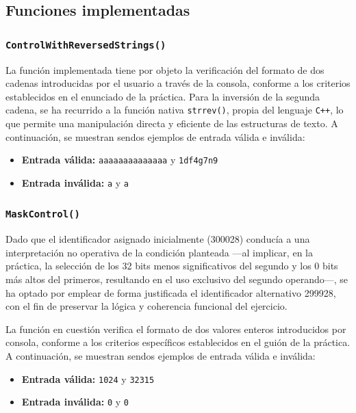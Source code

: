 \documentclass[11pt,a4paper]{article}
\begin{document}
\subsection{Funciones implementadas}
\subsubsection{\texttt{ControlWithReversedStrings()}}
La función implementada tiene por objeto la verificación del formato de dos cadenas introducidas por el usuario a través de la consola, conforme a los criterios establecidos en el enunciado de la práctica. Para la inversión de la segunda cadena, se ha recurrido a la función nativa \texttt{strrev()}, propia del lenguaje \texttt{C++}, lo que permite una manipulación directa y eficiente de las estructuras de texto. A continuación, se muestran sendos ejemplos de entrada válida e inválida:
\begin{itemize}
  \item \textbf{Entrada válida:} \texttt{aaaaaaaaaaaaaa} y \texttt{1df4g7n9}
  \item \textbf{Entrada inválida:} \texttt{a} y \texttt{a}
\end{itemize}

\vspace{3ex}

\subsubsection{\texttt{MaskControl()}}
\textcolor{naranjaDuro}{Dado que el identificador asignado inicialmente (300028) conducía a una interpretación no operativa de la condición planteada —al implicar, en la práctica, la selección de los 32 bits menos significativos del segundo y los 0 bits más altos del primeros, resultando en el uso exclusivo del segundo operando—, se ha optado por emplear de forma justificada el identificador alternativo 299928, con el fin de preservar la lógica y coherencia funcional del ejercicio.} \vspace{2ex}

\noindent La función en cuestión verifica el formato de dos valores enteros introducidos por consola, conforme a los criterios específicos establecidos en el guión de la práctica. A continuación, se muestran sendos ejemplos de entrada válida e inválida:
\begin{itemize}
  \item \textbf{Entrada válida:} \texttt{1024} y \texttt{32315}
  \item \textbf{Entrada inválida:} \texttt{0} y \texttt{0}
\end{itemize}
\vspace{2ex}
\end{document}
